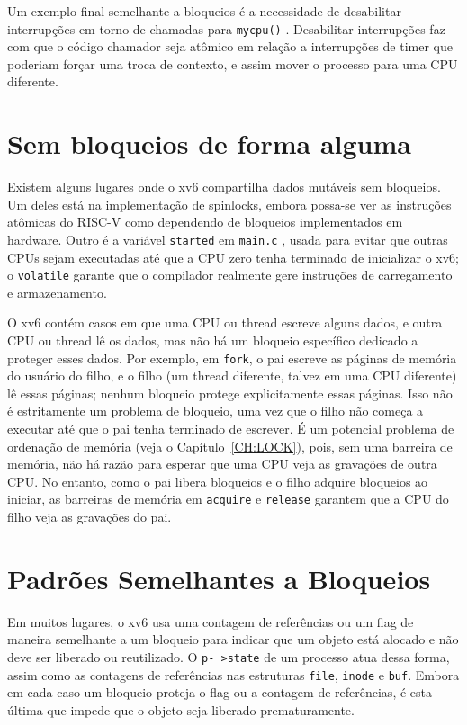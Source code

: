 Um exemplo final semelhante a bloqueios é a necessidade de desabilitar interrupções em torno de chamadas para {\tt mycpu()} . Desabilitar interrupções faz com que o 
código chamador seja atômico em relação a interrupções de timer que poderiam forçar uma troca de contexto, e assim mover o processo para uma CPU diferente.

\section{Sem bloqueios de forma alguma}

Existem alguns lugares onde o xv6 compartilha dados mutáveis sem bloqueios. Um deles está na implementação de spinlocks, embora possa-se ver as instruções atômicas do RISC-V como dependendo de 
bloqueios implementados em hardware. Outro é a variável {\tt started} em {\tt main.c} , usada para evitar que outras CPUs sejam executadas até que a CPU zero 
tenha terminado de inicializar o xv6; o {\tt volatile} garante que o compilador realmente gere instruções de carregamento e armazenamento.

O xv6 contém casos em que uma CPU ou thread escreve alguns dados, e outra CPU ou thread lê os dados, mas não há um bloqueio específico dedicado a proteger esses dados. Por exemplo, em {\tt fork}, o 
pai escreve as páginas de memória do usuário do filho, e o filho (um thread diferente, talvez em uma CPU diferente) lê essas páginas; nenhum bloqueio protege explicitamente essas páginas. Isso não 
é estritamente um problema de bloqueio, uma vez que o filho não começa a executar até que o pai tenha terminado de escrever. É um potencial problema de ordenação de memória (veja o 
Capítulo~\ref{CH:LOCK}), pois, sem uma barreira de memória, não há razão para esperar que uma CPU veja as gravações de outra CPU. No entanto, como o pai libera bloqueios e o filho adquire bloqueios 
ao iniciar, as barreiras de memória em {\tt acquire} e {\tt release} garantem que a CPU do filho veja as gravações do pai.

\section{Padrões Semelhantes a Bloqueios}

Em muitos lugares, o xv6 usa uma contagem de referências ou um flag de maneira semelhante a um bloqueio para indicar que um objeto está alocado e não deve ser liberado ou reutilizado. O {\tt p-
>state} de um processo atua dessa forma, assim como as contagens de referências nas estruturas {\tt file}, {\tt inode} e {\tt buf}. Embora em cada caso um bloqueio proteja o flag ou a contagem de 
referências, é esta última que impede que o objeto seja liberado prematuramente.

